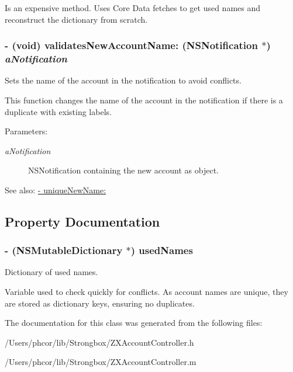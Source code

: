 Is an expensive method. Uses Core Data fetches to get used names and reconstruct the dictionary from scratch. \hypertarget{interface_z_x_account_controller_765323e412d28612c9737af99becf5c8}{
\subsubsection[{validatesNewAccountName:}]{\setlength{\rightskip}{0pt plus 5cm}- (void) validatesNewAccountName: (NSNotification $\ast$) {\em aNotification}}}
\label{interface_z_x_account_controller_765323e412d28612c9737af99becf5c8}


Sets the name of the account in the notification to avoid conflicts. 

This function changes the name of the account in the notification if there is a duplicate with existing labels. \begin{Desc}
\item[Parameters:]
\begin{description}
\item[{\em aNotification}]NSNotification containing the new account as object. \end{description}
\end{Desc}
\begin{Desc}
\item[See also:]\hyperlink{interface_z_x_account_controller_0efcea0525fa3f4d189fd52592fab996}{- uniqueNewName:} \end{Desc}


\subsection{Property Documentation}
\hypertarget{interface_z_x_account_controller_a7bdd570e90b4302106f265e73721a56}{
\subsubsection[{usedNames}]{\setlength{\rightskip}{0pt plus 5cm}- (NSMutableDictionary $\ast$) usedNames}}
\label{interface_z_x_account_controller_a7bdd570e90b4302106f265e73721a56}


Dictionary of used names. 

Variable used to check quickly for conflicts. As account names are unique, they are stored as dictionary keys, ensuring no duplicates. 

The documentation for this class was generated from the following files:\begin{CompactItemize}
\item 
/Users/phcor/lib/Strongbox/ZXAccountController.h\item 
/Users/phcor/lib/Strongbox/ZXAccountController.m\end{CompactItemize}
